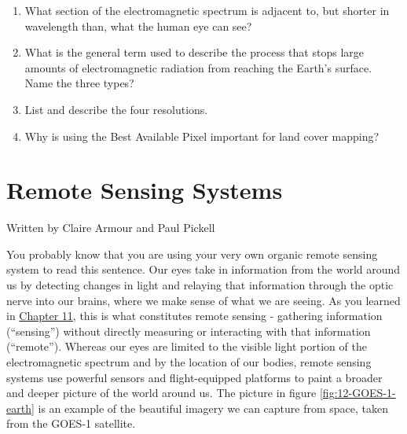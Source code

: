 \documentclass[
]{book}
\providecommand{\tightlist}{%
  \setlength{\itemsep}{0pt}\setlength{\parskip}{0pt}}
\begin{document}
\begin{enumerate}
\def\labelenumi{\arabic{enumi}.}
\tightlist
\item
  What section of the electromagnetic spectrum is adjacent to, but shorter in wavelength than, what the human eye can see?
\item
  What is the general term used to describe the process that stops large amounts of electromagnetic radiation from reaching the Earth's surface. Name the three types?
\item
  List and describe the four resolutions.
\item
  Why is using the Best Available Pixel important for land cover mapping?
\end{enumerate}

\chapter{Remote Sensing Systems}\label{remote-sensing-systems}

Written by
Claire Armour and Paul Pickell

You probably know that you are using your very own organic remote sensing system to read this sentence. Our eyes take in information from the world around us by detecting changes in light and relaying that information through the optic nerve into our brains, where we make sense of what we are seeing. As you learned in \href{https://ubc-geomatics-textbook.github.io/geomatics-textbook/fundamentals-of-remote-sensing.html}{Chapter 11}, this is what constitutes remote sensing - gathering information (``sensing'') without directly measuring or interacting with that information (``remote''). Whereas our eyes are limited to the visible light portion of the electromagnetic spectrum and by the location of our bodies, remote sensing systems use powerful sensors and flight-equipped platforms to paint a broader and deeper picture of the world around us. The picture in figure \ref{fig:12-GOES-1-earth} is an example of the beautiful imagery we can capture from space, taken from the GOES-1 satellite.
\end{document}
